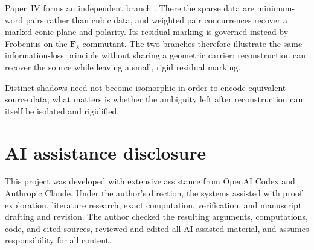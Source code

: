 \documentclass[11pt]{article}
\theoremstyle{definition}
\theoremstyle{remark}
\newcommand{\F}{\mathbf F}
\begin{document}
Paper~IV forms an independent branch \cite{RuddPassant2026}.  There the sparse
data are
minimum-word pairs rather than cubic data, and weighted pair concurrences
recover a marked conic plane and polarity.  Its residual marking is governed
instead by Frobenius on the \(\F_8\)-commutant.  The two branches therefore
illustrate the same information-loss principle without sharing a geometric
carrier: reconstruction can recover the source while leaving a small, rigid
residual marking.

Distinct shadows need not become isomorphic in order to encode equivalent
source data; what matters is whether the ambiguity left after reconstruction
can itself be isolated and rigidified.

\section*{AI assistance disclosure}

This project was developed with extensive assistance from OpenAI Codex and
Anthropic Claude. Under the author's direction, the systems assisted with
proof exploration, literature research, exact computation, verification,
and manuscript drafting and revision. The author checked the resulting
arguments, computations, code, and cited sources, reviewed and edited all
AI-assisted material, and assumes responsibility for all content.
\end{document}
